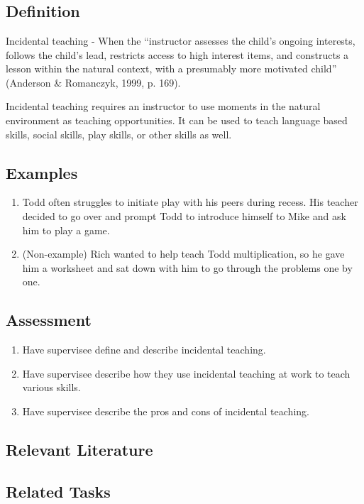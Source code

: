 \clearpage \section{\fourfSix{}}
\subsection{Definition}
Incidental teaching - When the ``instructor assesses the child's ongoing interests, follows the child's lead, restricts access to high interest items, and constructs a lesson within the natural context, with a presumably more motivated child'' (Anderson \& Romanczyk, 1999, p. 169).

Incidental teaching requires an instructor to use moments in the natural environment as teaching opportunities. It can be used to teach language based skills, social skills, play skills, or other skills as well.

\subsection{Examples}
\begin{enumerate}
\item Todd often struggles to initiate play with his peers during recess. His teacher decided to go over and prompt Todd to introduce himself to Mike and ask him to play a game. 
\item (Non-example) Rich wanted to help teach Todd multiplication, so he gave him a worksheet and sat down with him to go through the problems one by one.
\end{enumerate}
%
\subsection{Assessment}
\begin{enumerate}
\item Have supervisee define and describe incidental teaching.
\item Have supervisee describe how they use incidental teaching at work to teach various skills.
\item Have supervisee describe the pros and cons of incidental teaching.
%
\end{enumerate}
%
\subsection{Relevant Literature}
\begin{refsection}
\nocite{anderson1999early,
        cooper2007applied,
        hart1975incidental,
        mcgee2007incidental,
        mcgee1999incidental,
        mcgee1983modified}
\printbibliography[heading=none]
\end{refsection}
%
\subsection{Related Tasks}
\fourbThree{}\\ 
\fourdFour{}\\
\fourdFive{}\\
\fourdEleven{}\\
\fourjSix{}\\
\fourjEleven{}\\
\fourFKFourtyFour{}\\
